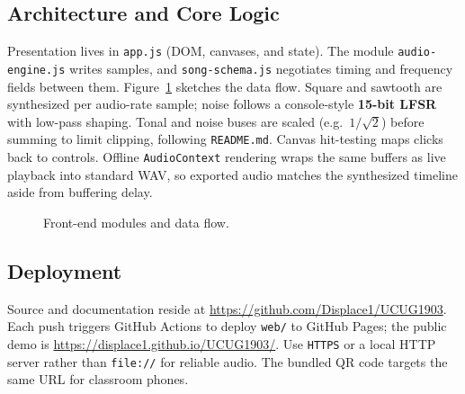 \subsection{Architecture and Core Logic}

Presentation lives in \texttt{app.js} (DOM, canvases, and state).
The module \texttt{audio-engine.js} writes samples, and \texttt{song-schema.js} negotiates timing and frequency fields between them.
Figure~\ref{fig:web-arch} sketches the data flow.
Square and sawtooth are synthesized per audio-rate sample; noise follows a console-style \textbf{15-bit LFSR} with low-pass shaping.
Tonal and noise buses are scaled (e.g.\ $1/\sqrt{2}$) before summing to limit clipping, following \texttt{README.md}.
Canvas hit-testing maps clicks back to controls.
Offline \texttt{AudioContext} rendering wraps the same buffers as live playback into standard WAV, so exported audio matches the synthesized timeline aside from buffering delay.

\begin{figure}[htbp]
  \centering
  \caption{Front-end modules and data flow.}
  \label{fig:web-arch}
\end{figure}

\subsection{Deployment}

Source and documentation reside at \url{https://github.com/Displace1/UCUG1903}.
Each push triggers GitHub Actions to deploy \texttt{web/} to GitHub Pages; the public demo is \url{https://displace1.github.io/UCUG1903/}.
Use \texttt{HTTPS} or a local HTTP server rather than \texttt{file://} for reliable audio.
The bundled QR code targets the same URL for classroom phones.
